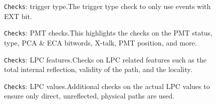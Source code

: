 \documentclass[12pt]{article}
\begin{document}
\begin{figure}
\centering
\noindent{}
  \caption{\centering \texttt{Checks}: trigger type.\hspace{\textwidth}The trigger type check to only use events with EXT bit.}
  \label{fig:ch1}
\end{figure}

\begin{figure}
\centering
\noindent{}
  \caption{\centering \texttt{Checks}: PMT checks.\hspace{\textwidth}This highlights the checks on the PMT status, type, PCA \& ECA bitwords, X-talk, PMT position, and more.}
  \label{fig:ch2}
\end{figure}

\begin{figure}
\centering
\noindent{}
  \caption{\centering \texttt{Checks}: LPC features.\hspace{\textwidth}Checks on LPC related features such as the total internal reflection, validity of the path, and the locality.}
  \label{fig:ch4}
\end{figure}

\begin{figure}
\centering
\noindent{}
  \caption{\centering \texttt{Checks}: LPC values.\hspace{\textwidth}Additional checks on the actual LPC values to ensure only direct, unreflected, physical paths are used.}
  \label{fig:ch5}
\end{figure}
\end{document}
